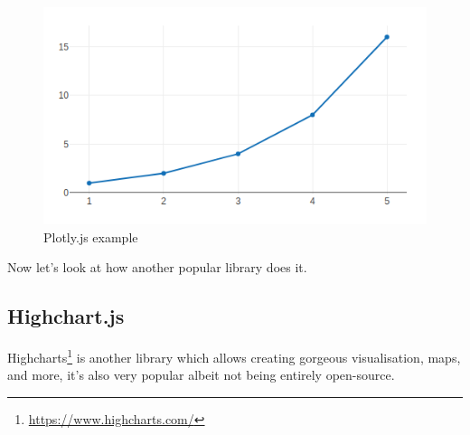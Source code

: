 \documentclass[
]{krantz}
\renewcommand{\href}[2]{#2\footnote{\url{#1}}}
\begin{document}
\begin{figure}
\centering
\includegraphics{images/candidate-plotly.png}
\caption{Plotly.js example}
\end{figure}

Now let's look at how another popular library does it.

\hypertarget{widgets-basics-candidates-highcharts}{%
\subsection{Highchart.js}\label{widgets-basics-candidates-highcharts}}

\href{https://www.highcharts.com/}{Highcharts} is another library which allows creating gorgeous visualisation, maps, and more, it's also very popular albeit not being entirely open-source.
\end{document}
